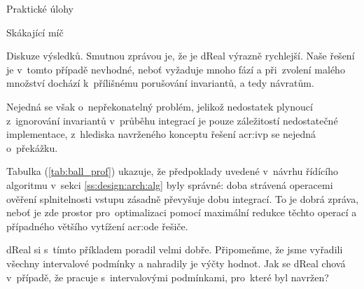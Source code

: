 \documentclass[thesis=M,czech]{FITthesis}[2012/06/26]
\newcommand{\acrlabel}[1]{acr:#1}
\newcommand{\acr}[1]{\acrshort{\acrlabel{#1}}}
\newcommand{\id}[1]{\texttt{#1}}
\newcommand{\rf}[1]{\ref{#1}}
\newcommand{\picFn}[1]{../img/#1}
\newcommand{\picL}{pic}
\newcommand{\rfPic}[1]{(\rf{\picL:#1})}
\newcommand{\pic}[5]{
\begin{figure}
{\centering
\texttt{[image: \\picFn\{\#1]}}
\caption{#4}
\label{\picL:#2}
}\smallskip
#5
\end{figure}
}
\newcommand{\tabL}{tab}
\newcommand{\rfTab}[1]{(\rf{\tabL:#1})}
\begin{document}
\begin{section}{Praktické úlohy}
\begin{subsection}{Skákající míč}
\begin{paragraph}{Diskuze výsledků.}
Smutnou zprávou je, že je dReal
výrazně rychlejší.
Naše řešení je v~tomto případě nevhodné,
neboť vyžaduje mnoho fází
a při~zvolení malého množství
dochází k~přílišnému porušování invariantů,
a tedy návratům.

Nejedná se však o~nepřekonatelný problém,
jelikož nedostatek plynoucí z~ignorování
invariantů v~průběhu integrací
je pouze záležitostí nedostatečné implementace,
z~hlediska navrženého konceptu řešení \acr{ivp}
se nejedná o~překážku.

Tabulka \rfTab{ball_prof} ukazuje,
že předpoklady uvedené v~návrhu
řídícího algoritmu v~sekci \rf{ss:design:arch:alg}
byly správné: doba strávená operacemi
ověření splnitelnosti vstupu
zásadně převyšuje dobu integrací.
To je dobrá zpráva,
neboť je zde prostor pro~optimalizaci
pomocí maximální redukce těchto operací
a případného většího vytížení \acr{ode} řešiče.
\end{paragraph} %


\bigskip

dReal si s~tímto příkladem poradil velmi dobře.
Připomeňme, že jsme vyřadili všechny intervalové podmínky
a nahradily je výčty hodnot.
Jak se dReal chová v~případě, že pracuje
s~intervalovými podmínkami,
pro~které byl navržen?


\end{subsection}
\end{section}
\end{document}
